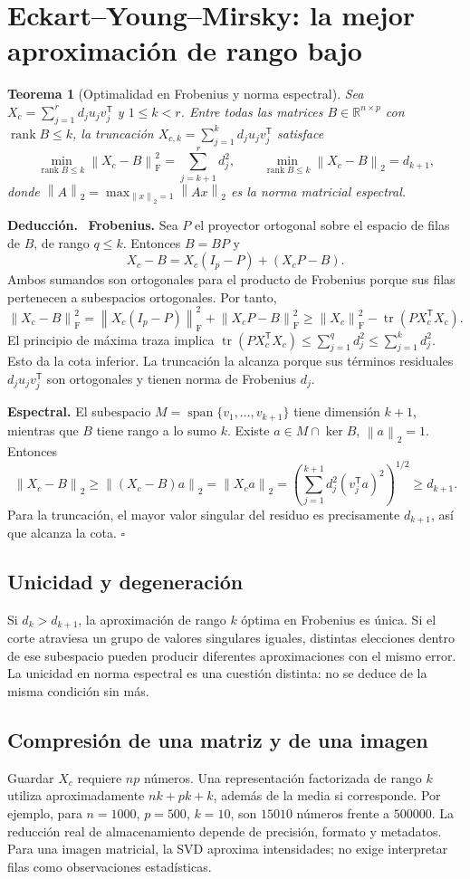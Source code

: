 \documentclass[11pt,a4paper]{article}
\newcommand{\R}{\mathbb R}
\newcommand{\T}{^{\mathsf T}}
\newcommand{\norm}[1]{\left\lVert #1\right\rVert}
\DeclareMathOperator{\spanop}{span}
\DeclareMathOperator{\tr}{tr}
\newenvironment{deduccion}{\par\textbf{Deducción.}\ }{\hfill$\square$\par}
\DeclareMathOperator{\rank}{rank}
\DeclareMathOperator{\kerop}{ker}
\newcommand{\F}{_{\mathrm F}}
\newtheorem{teorema}{Teorema}[section]
\theoremstyle{definition}
\begin{document}
\section{Eckart--Young--Mirsky: la mejor aproximación de rango bajo}
\begin{teorema}[Optimalidad en Frobenius y norma espectral]
Sea $X_c=\sum_{j=1}^rd_ju_jv_j\T$ y $1\le k<r$. Entre todas las matrices $B\in\R^{n\times p}$ con $\rank B\le k$, la truncación $X_{c,k}=\sum_{j=1}^kd_ju_jv_j\T$ satisface
\[
\min_{\rank B\le k}\norm{X_c-B}\F^2=\sum_{j=k+1}^rd_j^2,\qquad
\min_{\rank B\le k}\norm{X_c-B}_2=d_{k+1},
\]
donde $\norm A_2=\max_{\norm x_2=1}\norm{Ax}_2$ es la norma matricial espectral.
\end{teorema}
\begin{deduccion}
\textbf{Frobenius.} Sea $P$ el proyector ortogonal sobre el espacio de filas de $B$, de rango $q\le k$. Entonces $B=BP$ y
\[
X_c-B=X_c(I_p-P)+(X_cP-B).
\]
Ambos sumandos son ortogonales para el producto de Frobenius porque sus filas pertenecen a subespacios ortogonales. Por tanto,
\[
\norm{X_c-B}\F^2=\norm{X_c(I_p-P)}\F^2+\norm{X_cP-B}\F^2
\ge\norm{X_c}\F^2-\tr(PX_c\T X_c).
\]
El principio de máxima traza implica $\tr(PX_c\T X_c)\le\sum_{j=1}^q d_j^2\le\sum_{j=1}^kd_j^2$. Esto da la cota inferior. La truncación la alcanza porque sus términos residuales $d_ju_jv_j\T$ son ortogonales y tienen norma de Frobenius $d_j$.

\textbf{Espectral.} El subespacio $M=\spanop\{v_1,\ldots,v_{k+1}\}$ tiene dimensión $k+1$, mientras que $B$ tiene rango a lo sumo $k$. Existe $a\in M\cap\kerop B$, $\norm a_2=1$. Entonces
\[
\norm{X_c-B}_2\ge\norm{(X_c-B)a}_2=\norm{X_ca}_2
=\left(\sum_{j=1}^{k+1}d_j^2(v_j\T a)^2\right)^{1/2}\ge d_{k+1}.
\]
Para la truncación, el mayor valor singular del residuo es precisamente $d_{k+1}$, así que alcanza la cota.
\end{deduccion}
\subsection{Unicidad y degeneración}
Si $d_k>d_{k+1}$, la aproximación de rango $k$ óptima en Frobenius es única. Si el corte atraviesa un grupo de valores singulares iguales, distintas elecciones dentro de ese subespacio pueden producir diferentes aproximaciones con el mismo error. La unicidad en norma espectral es una cuestión distinta: no se deduce de la misma condición sin más.
\subsection{Compresión de una matriz y de una imagen}
Guardar $X_c$ requiere $np$ números. Una representación factorizada de rango $k$ utiliza aproximadamente $nk+pk+k$, además de la media si corresponde. Por ejemplo, para $n=1000$, $p=500$, $k=10$, son $15010$ números frente a $500000$. La reducción real de almacenamiento depende de precisión, formato y metadatos. Para una imagen matricial, la SVD aproxima intensidades; no exige interpretar filas como observaciones estadísticas.
\end{document}

